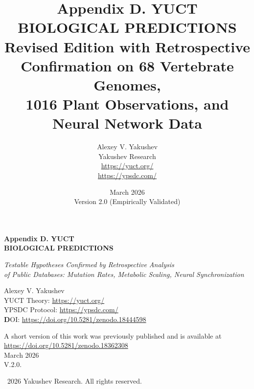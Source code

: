 \documentclass[11pt]{article}
\title{Appendix D. YUCT\\
	BIOLOGICAL PREDICTIONS \\
	\Large Revised Edition with Retrospective Confirmation on 68 Vertebrate Genomes, \\
	1016 Plant Observations, and Neural Network Data}
\author{Alexey V. Yakushev \\ Yakushev Research \\ \url{https://yuct.org/} \\ \url{https://ypsdc.com/}}
\date{March 2026 \\ Version 2.0 (Empirically Validated)}
\begin{document}
	
	\begin{titlepage}
		\begin{center}
			\vspace*{3cm}
			\Huge\textbf{Appendix D. YUCT\\
				BIOLOGICAL PREDICTIONS}
			
			\vspace{1cm}
			\LARGE\textit{Testable Hypotheses Confirmed by Retrospective Analysis \\
				of Public Databases: Mutation Rates, Metabolic Scaling, Neural Synchronization}
			
			\vspace{1cm}
			\Large
			Alexey V. Yakushev\\
			
	YUCT Theory: \url{https://yuct.org/}\\
YPSDC Protocol: \url{https://ypsdc.com/}\\


\vspace{2cm}
\textbf DOI: \url{https://doi.org/10.5281/zenodo.18444598}\\

\vspace{1cm}

\vspace{0cm}
\large 
A short version of this work was previously published and is available at\\ \url{https://doi.org/10.5281/zenodo.18362308}\\
\vspace{1cm}
March 2026 \\ \large V.2.0.
			
			\vspace{5cm}
			\textcopyright~2026 Yakushev Research. All rights reserved.
			

\end{center}
\end{titlepage}
\end{document}
